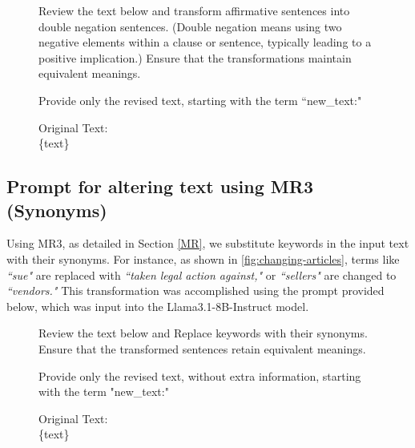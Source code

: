 \begin{figure}[h]
    \begin{tcolorbox}[colback=gray!10, colframe=gray!50, rounded corners, width=\linewidth, arc=2mm, boxrule=0.5mm, title=]

\vspace{0.3cm} 
Review the text below and transform affirmative sentences into double negation sentences. (Double negation means using two negative elements within a clause or sentence, typically leading to a positive implication.) Ensure that the transformations maintain equivalent meanings.

Provide only the revised text, starting with the term ``new\_text:"

\vspace{0.3cm} 

Original Text: \\
\{text\}
\end{tcolorbox}
\end{figure}


\subsection{Prompt for altering text using MR3 (Synonyms)}
Using MR3, as detailed in Section \ref{MR}, we substitute keywords in the input text with their synonyms. For instance, as shown in \ref{fig:changing-articles}, terms like \textit{``sue"} are replaced with \textit{``taken legal action against,"} or \textit{``sellers"} are changed to \textit{``vendors."} This transformation was accomplished using the prompt provided below, which was input into the Llama3.1-8B-Instruct model.
\label{MR3_prompt_altering}
\begin{figure}[h]
    \begin{tcolorbox}[colback=gray!10, colframe=gray!50, rounded corners, width=\linewidth, arc=2mm, boxrule=0.5mm, title=]

\vspace{0.3cm} 
Review the text below and Replace keywords with their synonyms. Ensure that the transformed sentences retain equivalent meanings.

Provide only the revised text, without extra information, starting with the term "new\_text:"

\vspace{0.3cm} 

Original Text: \\
\{text\}
\end{tcolorbox}
\end{figure}

